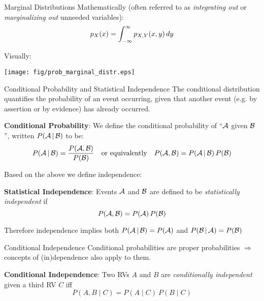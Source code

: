{\begin{frame}{Marginal Distributions}
        Mathematically (often referred to as \emph{integrating out} or \emph{marginalizing out} unneeded variables):
        $$p _ X(x) = \int_{-\infty}^\infty p_{X, Y}(x, y) \mathop{dy}$$

        Visually:
        \begin{center}
            \texttt{[image: fig/prob\_marginal\_distr.eps]}
        \end{center}
    \end{frame}

    \begin{frame}{Conditional Probability and Statistical  Independence}
        The conditional distribution quantifies the probability of an event occurring,
        given that another event (e.g. by assertion or by evidence) has already occurred.

        \begin{boxed}
            \textbf{Conditional Probability}:
            We define the conditional probability of ``$\mathcal{A}$ given $\mathcal{B}$'', written $P(\mathcal{A} \,|\, \mathcal{B})$ to be:
            $$P(\mathcal{A} \,|\, \mathcal{B}) = \frac{P(\mathcal{A}, \mathcal{B})}{P(\mathcal{B})}
                \quad \text{or equivalently} \quad
                P(\mathcal{A}, \mathcal{B}) = P(\mathcal{A} \,|\, \mathcal{B}) \, P(\mathcal{B})$$
        \end{boxed}

        Based on the above we define independence:

        \begin{boxed}
            \textbf{Statistical Independence}:
            Events $\mathcal{A}$ and $\mathcal{B}$ are defined to be \emph{statistically independent} if
            $$P(\mathcal{A}, \mathcal{B}) = P(\mathcal{A}) \, P(\mathcal{B})$$
        \end{boxed}

        Therefore independence implies both $P(\mathcal{A} \,|\, \mathcal{B}) = P(\mathcal{A})$ and $P(\mathcal{B} \,|\, \mathcal{A}) = P(\mathcal{B})$
    \end{frame}

    \begin{frame}{Conditional Independence}
        Conditional probabilities are proper probabilities $\Rightarrow$ concepts of (in)dependence also apply to them.

        \begin{boxed}
            \textbf{Conditional Independence}:
            Two RVs $A$ and $B$ are \emph{conditionally independent} given a third RV $C$ iff
            $$P(A, B \mid C) = P(A \mid C) \: P(B \mid C)$$
        \end{boxed}


\end{frame}}
